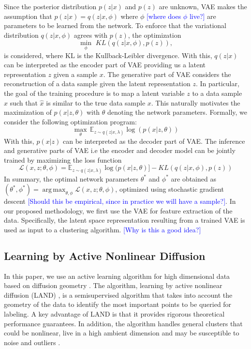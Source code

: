 \documentclass{article}
\def\E{{\mathbb E}}
\DeclareMathOperator*{\argmax}{arg\,max}
\newcommand{\JMM}[1]{{\textcolor{blue}{[#1]}}}
\begin{document}
Since the posterior distribution $p(z|x)$ and $p(z)$ are unknown, VAE makes the assumption that $p(z|x) = q(z|x,\phi)$ where $\phi$ \JMM{where does $\phi$ live?} are parameters to be learned from the network. To enforce that the variational distribution $q(z|x,\phi)$ agrees with $p(z)$, the optimization \[\min_{\phi}\,\, KL(q(z|x,\phi),p(z)),\] is considered, where KL is the Kullback-Leibler divergence.  With this, $q(z|x)$ can be interpreted as the encoder part of VAE providing us a latent representation $z$ given a sample $x$. The generative part of VAE considers the reconstruction of a data sample given the latent representation $z$. In particular, the goal of the training procedure is to map a latent variable $z$ to a data sample $\hat{x}$ such that $\hat{x}$ is similar to the true data sample $x$. This naturally motivates the maximization of $p(x|z,\theta)$ with $\theta$ denoting the network parameters. Formally, we consider the following optimization program:
\[
\max_{\theta}\, \E_{z \sim q(z|x,\lambda)} \log(p(x|z,\theta))
\]
With this, $p(x|z)$ can be interpreted as the decoder part of VAE. The inference and generative parts of VAE i.e the encoder and decoder model can be jointly trained by maximizing the loss function $$\mathcal{L}(x,z;\theta,\phi)
=  \E_{z\sim q(z|x,\lambda)} \log(p(x|z,\theta)] - KL(q(z|x,\phi),p(z))$$ In summary, the optimal network parameters $\theta^{*}$ and $\phi^{*}$ are obtained as $(\theta^{*},\phi^{*})=\argmax_{\theta,\phi} \mathcal{L}(x,z;\theta,\phi)$, optimized using stochastic gradient descent \JMM{Should this be empirical, since in practice we will have a sample?}. In our proposed methodology, we first use the VAE for feature extraction of the data. Specifically, the latent space representation resulting from a trained VAE is used as input to a clustering algorithm.  \JMM{Why is this a good idea?}

\subsection{Learning by Active Nonlinear Diffusion}
In this paper, we use an active learning algorithm for high dimensional data based on diffusion geometry \cite{Murphy2019_Unsupervised, Maggioni2019_LUND, Murphy2019_Spectral}. The algorithm, learning by active nonlinear diffusion (LAND) \cite{Maggioni2019_LAND}, is a semisupervised algorithm that takes into account the geometry of the data to identify the most important points to be queried for labeling. A key advantage of LAND is that it provides rigorous theoretical performance guarantees. In addition, the algorithm handles general clusters that could be nonlinear, live in a high ambient dimension and may be susceptible to noise and outliers \cite{Maggioni2019_LAND}.
\end{document}
